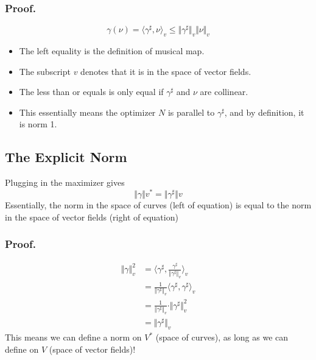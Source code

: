 \documentclass[10pt]{article}
\begin{document}
\subsubsection*{Proof.}
\[\gamma(\nu) = \langle \gamma^\sharp, \nu\rangle_v \leq \Vert \gamma^\sharp \Vert_v \Vert \nu \Vert_v\]
\begin{itemize}
    \item The left equality is the definition of musical map.  
    \item The subscript $v$ denotes that it is in the space of vector fields.  
    \item The less than or equals is only equal if $\gamma^\sharp$ and $\nu$ are collinear.
    \item This essentially means the optimizer $N$ is parallel to $\gamma^\sharp$, and by definition, it is norm 1.
\end{itemize}



\subsection*{The Explicit Norm}
Plugging in the maximizer gives
\[\Vert \gamma \Vert v^* = \Vert \gamma^\sharp \Vert v\]
Essentially, the norm in the space of curves (left of equation) is equal to the norm in the space of vector fields (right of equation)

\subsubsection*{Proof.}
\begin{align*}
    \Vert \gamma \Vert^2_v &= \langle \gamma^\sharp, \frac{\gamma^\sharp}{\Vert \gamma^\sharp \Vert_v} \rangle_v\\
    &= \frac{1}{\Vert \gamma^\sharp \Vert_v} \langle \gamma^\sharp, \gamma^\sharp \rangle_v\\
    &= \frac{1}{\Vert \gamma^\sharp \Vert_v} \cdot \Vert \gamma^\sharp \Vert_v^2 \\
    &= \Vert \gamma^\sharp \Vert_v
\end{align*}
This means we can define a norm on $V^*$ (space of curves), as long as we can define on $V$ (space of vector fields)!
\end{document}
